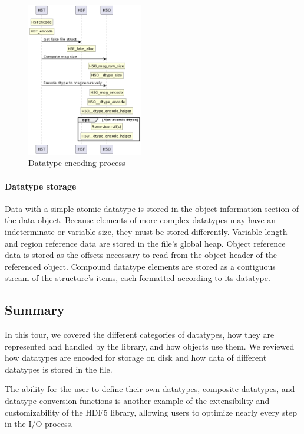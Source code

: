 \begin{figure}
    \centering
    \includegraphics[width=0.45\textwidth]{images/tour_5_uml_datatype_encode.png}
    \caption{Datatype encoding process}
    \label{fig:tour-5-uml-datatype-encode}
\end{figure}

\paragraph{Datatype storage} Data with a simple atomic datatype is stored in the object information section of the data object. Because elements of more complex datatypes may have an indeterminate or variable size, they must be stored differently. Variable-length and region reference data are stored in the file's global heap. Object reference data is stored as the offsets necessary to read from the object header of the referenced object. Compound datatype elements are stored as a contiguous stream of the structure's items, each formatted according to its datatype.

\subsection{Summary} 

In this tour, we covered the different categories of datatypes, how they are represented and handled by the library, and how objects use them. We reviewed how datatypes are encoded for storage on disk and how data of different datatypes is stored in the file.

The ability for the user to define their own datatypes, composite datatypes, and datatype conversion functions is another example of the extensibility and customizability of the HDF5 library, allowing users to optimize nearly every step in the I/O process.
